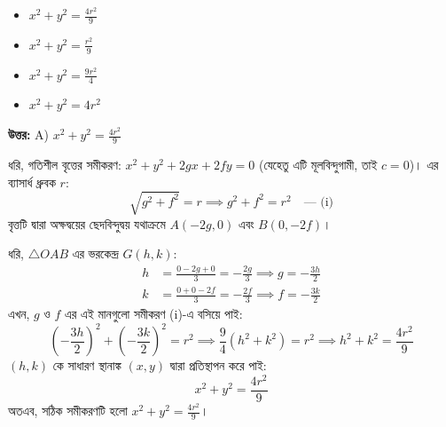 \documentclass[12pt, a4paper]{article}
\begin{document}
\begin{itemize}[label={}, leftmargin=1cm, itemsep=0.5em]
    \item[\textbf{A)}] $x^2 + y^2 = \frac{4r^2}{9}$
    \item[\textbf{B)}] $x^2 + y^2 = \frac{r^2}{9}$
    \item[\textbf{C)}] $x^2 + y^2 = \frac{9r^2}{4}$
    \item[\textbf{D)}] $x^2 + y^2 = 4r^2$
\end{itemize}

\vspace{0.5em}
\begin{tcolorbox}[answerbox]
    \textbf{\color{success} উত্তর:} A) $x^2 + y^2 = \frac{4r^2}{9}$
\end{tcolorbox}
\vspace{1em}

\begin{tcolorbox}[solutionbox={সমাধান (Solution)}]
    \noindent
    ধরি, গতিশীল বৃত্তের সমীকরণ: $x^2 + y^2 + 2gx + 2fy = 0$ (যেহেতু এটি মূলবিন্দুগামী, তাই $c = 0$)। 
    এর ব্যাসার্ধ ধ্রুবক $r$:
    \[ \sqrt{g^2 + f^2} = r \implies g^2 + f^2 = r^2 \quad \text{--- (i)} \]
    বৃত্তটি দ্বারা অক্ষদ্বয়ের ছেদবিন্দুদ্বয় যথাক্রমে $A(-2g, 0)$ এবং $B(0, -2f)$। 
    
    \vspace{0.5em}
    ধরি, $\triangle OAB$ এর ভরকেন্দ্র $G(h, k)$:
    \begin{align*}
        h &= \frac{0 - 2g + 0}{3} = -\frac{2g}{3} \implies g = -\frac{3h}{2} \\
        k &= \frac{0 + 0 - 2f}{3} = -\frac{2f}{3} \implies f = -\frac{3k}{2}
    \end{align*}
    এখন, $g$ ও $f$ এর এই মানগুলো সমীকরণ (i)-এ বসিয়ে পাই:
    \[ \left(-\frac{3h}{2}\right)^2 + \left(-\frac{3k}{2}\right)^2 = r^2 \implies \frac{9}{4}(h^2 + k^2) = r^2 \implies h^2 + k^2 = \frac{4r^2}{9} \]
    $(h, k)$ কে সাধারণ স্থানাঙ্ক $(x, y)$ দ্বারা প্রতিস্থাপন করে পাই:
    \[ x^2 + y^2 = \frac{4r^2}{9} \]
    অতএব, সঠিক সমীকরণটি হলো $x^2 + y^2 = \frac{4r^2}{9}$।
\end{tcolorbox}
\end{document}
